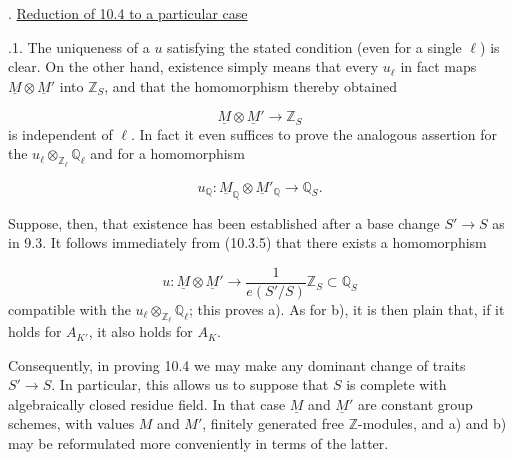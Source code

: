 
\medskip
{}. \underline{Reduction of 10.4 to a particular case}

\smallskip
{}.1. The uniqueness of a $u$ satisfying the stated condition (even
for a single $\ell$) is clear. On the other hand, existence simply means
that every $u_\ell$ in fact maps $\underline M\otimes\underline M'$ into
$\mathbb Z_S$, and that the homomorphism thereby obtained

\begin{equation*}
\underline M\otimes\underline M'\longrightarrow\mathbb Z_S
\end{equation*}
is independent of $\ell$. In fact it even suffices to prove the analogous
assertion for the $u_\ell\otimes_{\mathbb Z_\ell}\mathbb Q_\ell$ and for
a homomorphism

\begin{equation*}
u_{\mathbb Q}:\underline M_{\mathbb Q}\otimes
 \underline M'_{\mathbb Q}\longrightarrow\mathbb Q_S.
\end{equation*}

Suppose, then, that existence has been established after a base change
$S'\longrightarrow S$ as in 9.3. It follows immediately from (10.3.5)
that there exists a homomorphism

\begin{equation*}
u:\underline M\otimes\underline M'
 \longrightarrow\frac{1}{e(S'/S)}\mathbb Z_S\subset\mathbb Q_S
\end{equation*}
compatible with the $u_\ell\otimes_{\mathbb Z_\ell}\mathbb Q_\ell$;
this proves a). As for b), it is then plain that, if it holds for
$A_{K'}$, it also holds for $A_K$.

Consequently, in proving 10.4 we may make any dominant change of traits
$S'\longrightarrow S$. In particular, this allows us to suppose that
$S$ is complete with algebraically closed residue field. In that case
$\underline M$ and $\underline M'$ are constant group schemes, with
values $M$ and $M'$, finitely generated free $\mathbb Z$-modules, and a)
and b) may be reformulated more conveniently in terms of the latter.

